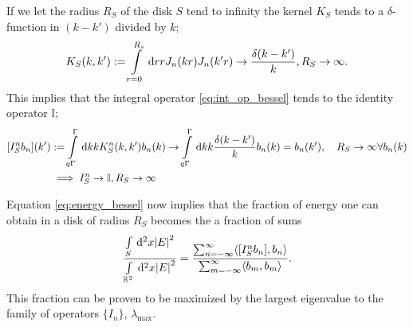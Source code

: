 \documentclass[11pt,a4paper, 
swedish,english %
]{article}
\begin{document}
If we let the radius $R_S$ of the disk $S$ tend to infinity the kernel $K_S$ tends to a $\delta$-function in $(k-k')$ divided by $k$;
\begin{equation*}
K_S(k,k')  := \int_{r=0}^{R_s} \id r r J_n(kr) J_n(k'r) \to \frac{\delta(k-k')}{k}, R_S \to \infty.
  \end{equation*}
This implies that the integral operator \ref{eq:int_op_bessel} tends to the identity operator $\mathbb{I}$;
\begin{equation*}
  \begin{aligned}
    [I_S^nb_n](k')&:=\int_{q\Gamma}^\Gamma \id k k K_S^n(k,k')b_n(k) \to \int_{q\Gamma}^\Gamma \id k k \frac{\delta(k-k')}{k}b_n(k)
    =b_n(k') \qc R_S \to \infty \forall b_n(k)\\
  &\implies I_S^n \to \mathbb{I}, R_S \to \infty
   \end{aligned}
\end{equation*}

Equation \eqref{eq:energy_bessel} now implies that the fraction of energy one can obtain in a disk of radius $R_S$ becomes the a fraction of sums
\begin{equation}
  \label{eq:energy_frac_bessel}
\frac{\int_S \id^2x \abs{E}^2}{\int_{\mathbb{R}^2} \id^2x \abs{E}^2}=\frac{\sum_{n=-\infty}^{\infty} \langle [I_S^nb_n],b_n \rangle}{\sum_{m=-\infty}^{\infty} \langle b_m,b_m \rangle}.
\end{equation}
This fraction can be proven to be maximized by the largest eigenvalue to the family of operators $\{I_n\}$, $\lambda_\text{max}$.
  
\end{document}
